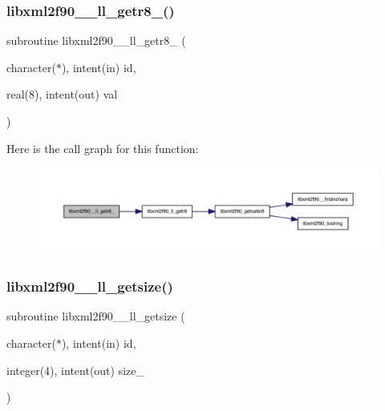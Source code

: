 \subsubsection{\texorpdfstring{libxml2f90\+\_\+\+\_\+ll\+\_\+getr8\+\_\+()}{libxml2f90\_\_ll\_getr8\_()}}
{\footnotesize\ttfamily subroutine libxml2f90\+\_\+\+\_\+ll\+\_\+getr8\+\_\+ (\begin{DoxyParamCaption}\item[{character($\ast$), intent(in)}]{id,  }\item[{real(8), intent(out)}]{val }\end{DoxyParamCaption})}

Here is the call graph for this function\+:
\nopagebreak
\begin{figure}[H]
\begin{center}
\leavevmode
\includegraphics[width=350pt]{libxml2f90_8f90__pp_8f90_a77f33adc7fb009d5c2f4b8e5201c8f44_cgraph}
\end{center}
\end{figure}
\mbox{\label{libxml2f90_8f90__pp_8f90_a6ae6ccc230fcca3282294c098febee5a}} 
\subsubsection{\texorpdfstring{libxml2f90\+\_\+\+\_\+ll\+\_\+getsize()}{libxml2f90\_\_ll\_getsize()}}
{\footnotesize\ttfamily subroutine libxml2f90\+\_\+\+\_\+ll\+\_\+getsize (\begin{DoxyParamCaption}\item[{character($\ast$), intent(in)}]{id,  }\item[{integer(4), intent(out)}]{size\+\_\+ }\end{DoxyParamCaption})}

